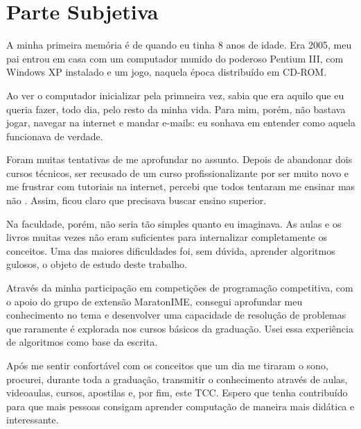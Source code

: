 \chapter{Parte Subjetiva}
\label{subjetiva}


A minha primeira memória é de quando eu tinha 8 anos de idade. Era 2005, meu pai entrou em casa com um computador munido do poderoso Pentium III, com Windows XP instalado e um jogo, naquela época distribuído em CD-ROM.

Ao ver o computador inicializar pela primneira vez, sabia que era aquilo que eu queria fazer, todo dia, pelo resto da minha vida. Para mim, porém, não bastava jogar, navegar na internet e mandar e-mails: eu sonhava em entender como aquela  funcionava de verdade.

Foram muitas tentativas de me aprofundar no assunto. Depois de abandonar dois cursos técnicos, ser recusado de um curso profissionalizante por ser muito novo e me frustrar com tutoriais na internet, percebi que todos tentaram me ensinar  mas não . Assim, ficou claro que precisava buscar ensino superior.

Na faculdade, porém, não seria tão simples quanto eu imaginava. As aulas e os livros muitas vezes não eram suficientes para internalizar completamente os conceitos. Uma das maiores dificuldades foi, sem dúvida, aprender algoritmos gulosos, o objeto de estudo deste trabalho.

Através da minha participação em competições de programação competitiva, com o apoio do grupo de extensão MaratonIME, consegui aprofundar meu conhecimento no tema e desenvolver uma capacidade de resolução de problemas que raramente é explorada nos cursos básicos da graduação. Usei essa experiência de algoritmos  como base da escrita.  

Após me sentir confortável com os conceitos que um dia me tiraram o sono, procurei, durante toda a graduação, transmitir o conhecimento através de aulas, videoaulas, cursos, apostilas e, por fim, este TCC. Espero que tenha contribuído para que mais pessoas consigam aprender computação de maneira mais didática e interessante.